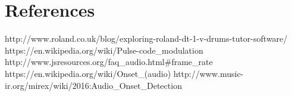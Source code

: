 \documentclass[a4paper, 11pt]{article}
\begin{document}
\maketitle{} 
\section{References}
http://www.roland.co.uk/blog/exploring-roland-dt-1-v-drums-tutor-software/
https://en.wikipedia.org/wiki/Pulse-code\_modulation
http://www.jsresources.org/faq\_audio.html\#frame\_rate
https://en.wikipedia.org/wiki/Onset\_(audio)
http://www.music-ir.org/mirex/wiki/2016:Audio\_Onset\_Detection
\end{document}
